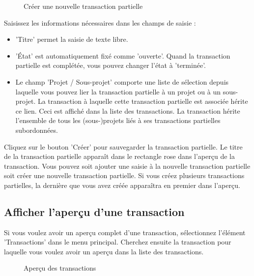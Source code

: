 \begin{figure}[H]
\caption{Créer une nouvelle transaction partielle}
\end{figure}

Saisissez les informations nécessaires dans les champs de saisie :

\begin{itemize}
\item
'Titre'  permet la saisie de texte libre.
\item
'État'  est automatiquement fixé comme 'ouverte'. Quand la transaction partielle est complétée, vous pouvez changer l'état à 'terminée'.
\item
Le champ 'Projet / Sous-projet'  comporte une liste de sélection depuis laquelle vous pouvez lier la transaction partielle à un projet ou à un sous-projet. La transaction à laquelle cette transaction partielle est associée hérite ce lien. Ceci est affiché dans la liste des transactions. La transaction hérite l'ensemble de tous les (sous-)projets liés à ses transactions partielles subordonnées.
\end{itemize}

Cliquez sur le bouton 'Créer'  pour sauvegarder la transaction partielle. Le titre de la transaction partielle apparaît dans le rectangle rose dans l'aperçu de la transaction. Vous pouvez soit ajouter une saisie à la nouvelle transaction partielle soit créer une nouvelle transaction partielle. Si vous créez plusieurs transactions partielles, la dernière que vous avez créée apparaîtra en premier dans l'aperçu.

\subsection{Afficher l'aperçu d'une transaction}

Si vous voulez avoir un aperçu complet d'une transaction, sélectionnez l'élément 'Transactions' dans le menu principal. Cherchez ensuite la transaction pour laquelle vous voulez avoir un aperçu dans la liste des transactions.

\begin{figure}[H]
\caption{Aperçu des transactions}
\end{figure}

